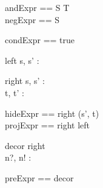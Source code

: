 \begin{zed}
  andExpr == S \land T\\
  negExpr == \lnot S
\end{zed}

\begin{zed}
  condExpr == \IF true  
\end{zed}

\begin{schema}{left}
  s, s' : \nat
\end{schema}

\begin{schema}{right}
  s, s' : \nat\\
  t, t' : \nat
\end{schema}

\begin{zed}
  hideExpr == right \hide (s', t)\\
  projExpr == right \project left
\end{zed}

\begin{schema}{decor}
  right\\
  n?, n! : \nat
\end{schema}

\begin{zed}
  preExpr == \pre decor
\end{zed}
